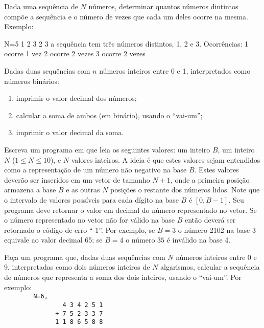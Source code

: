 \item Dada uma sequência de $N$ números, determinar quantos números dintintos
compõe  a sequência e  o número  de vezes  que cada  um deles  ocorre na
mesma. Exemplo:

N=5
1 2 3 2 3 
a sequência tem três números distintos, 1, 2 e 3. Ocorrências:
1 ocorre 1 vez
2 ocorre 2 vezes
3 ocorre 2 vezes

\item Dadas  duas  sequências  com  $n$  números  inteiros  entre  0  e  1,
interpretados como números binários:
\begin{enumerate}
     \item imprimir o valor decimal dos números;
     \item calcular a soma de ambos (em binário), usando o ``vai-um'';
     \item imprimir o valor decimal da soma.
\end{enumerate}


\item Escreva um programa em  que leia os seguintes valores:
um inteiro $B$, um inteiro $N$ ($1 \leq N \leq 10$), e $N$ valores inteiros.
A ideia é que estes valores sejam entendidos como a representação
de um número não negativo na base $B$. 
Estes valores deverão ser inseridos em um vetor de tamanho $N+1$, onde
a primeira posição armazena a base $B$ e as outras $N$ posições
o restante dos números lidos. 
%
Note que o  intervalo de valores possíveis para cada dígito na
base $B$ é $[0, B-1]$.
%
Seu programa deve retornar o valor em decimal do número representado
no vetor. Se o número representado no vetor não for válido na
base $B$ então deverá ser retornado o código de erro ``-1''.
Por exemplo, se $B=3$ o número 2102 na base 3 equivale ao valor decimal 65;
se $B=4$ o número $35$ é inválido na base 4.


\item Faça um programa que, 
dadas duas sequências com
$N$ números inteiros entre 0 e 9, interpretadas como dois números
inteiros de $N$ algarismos, calcular a sequência de números que
representa a soma dos dois inteiros, usando o ``vai-um''. Por exemplo:\\

\verb|        N=6,|\\
\verb|                4 3 4 2 5 1|\\
\verb|              + 7 5 2 3 3 7|\\
\verb|              1 1 8 6 5 8 8|



